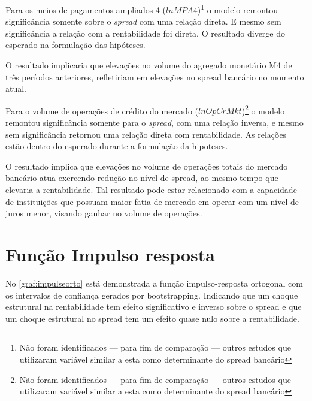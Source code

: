 \documentclass[
  12pt,
  12pt,
  openright,
  oneside,
  a4paper,
  chapter=TITLE,
  section=TITLE,
  subsection=TITLE,
  subsubsection=TITLE,
  english,
  portugues,
  sumario=tradicional]{abntex2}
\begin{document}
Para os meios de pagamentos ampliados 4 (\(lnMPA4\))\footnote{Não foram identificados — para fim de comparação — outros estudos que utilizaram variável similar a esta como determinante do spread bancário} o modelo remontou significância somente sobre o \emph{spread} com uma relação direta. E mesmo sem significância a relação com a rentabilidade foi direta. O resultado diverge do esperado na formulação das hipóteses.

O resultado implicaria que elevações no volume do agregado monetário M4 de três períodos anteriores, refletiriam em elevações no spread bancário no momento atual.

Para o volume de operações de crédito do mercado (\(lnOpCrMkt\))\footnote{Não foram identificados — para fim de comparação — outros estudos que utilizaram variável similar a esta como determinante do spread bancário} o modelo remontou significância somente para o \emph{spread}, com uma relação inversa, e mesmo sem significância retornou uma relação direta com rentabilidade. As relações estão dentro do esperado durante a formulação da hipoteses.

O resultado implica que elevações no volume de operações totais do mercado bancário atua exercendo redução no nível de spread, ao mesmo tempo que elevaria a rentabilidade. Tal resultado pode estar relacionado com a capacidade de instituições que possuam maior fatia de mercado em operar com um nível de juros menor, visando ganhar no volume de operações.

\section{Função Impulso resposta}

No \autoref{graf:impulseorto} está demonstrada a função impulso-resposta ortogonal com os intervalos de confiança gerados por bootstrapping. Indicando que um choque estrutural na rentabilidade tem efeito significativo e inverso sobre o spread e que um choque estrutural no spread tem um efeito quase nulo sobre a rentabilidade.

\vspace{20pt}
\end{document}
